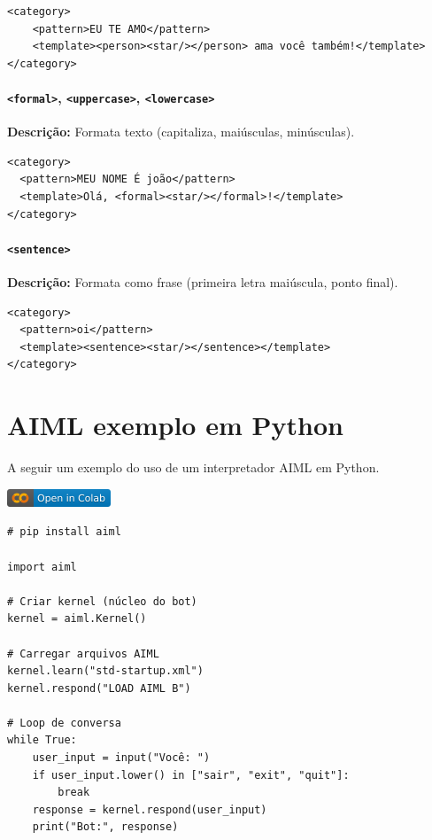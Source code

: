 \documentclass[14pt,a4paper,oneside]{book}
\begin{document}
\begin{lstlisting}
<category>
	<pattern>EU TE AMO</pattern>
	<template><person><star/></person> ama você também!</template>
</category>
\end{lstlisting}

\paragraph{\texttt{<formal>}, \texttt{<uppercase>}, \texttt{<lowercase>}} 

\textbf{Descrição:} Formata texto (capitaliza, maiúsculas, minúsculas). 

\begin{lstlisting}
<category>
  <pattern>MEU NOME É joão</pattern>
  <template>Olá, <formal><star/></formal>!</template>
</category>
\end{lstlisting}

\paragraph{\texttt{<sentence>}} 

\textbf{Descrição:} Formata como frase (primeira letra maiúscula, ponto final). 

\begin{lstlisting}
<category>
  <pattern>oi</pattern>
  <template><sentence><star/></sentence></template>
</category>
\end{lstlisting}

\section{AIML exemplo em Python}

A seguir um exemplo do uso de um interpretador AIML em Python.

\vspace{\baselineskip}
\href{https://colab.research.google.com/github/giseldo/chatbotbook/blob/main/notebook/aiml/aiml1_1.ipynb}{
  \includegraphics{./fig/colab-badge.png}
}

\begin{lstlisting}
# pip install aiml

import aiml

# Criar kernel (núcleo do bot)
kernel = aiml.Kernel()

# Carregar arquivos AIML
kernel.learn("std-startup.xml")
kernel.respond("LOAD AIML B")

# Loop de conversa
while True:
    user_input = input("Você: ")
    if user_input.lower() in ["sair", "exit", "quit"]:
        break
    response = kernel.respond(user_input)
    print("Bot:", response)
\end{lstlisting}
\end{document}
